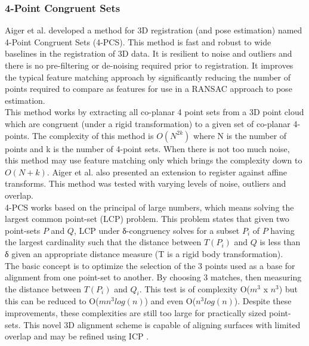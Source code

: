 \subsubsection{4-Point Congruent Sets}

Aiger et al. \cite{Aiger084} developed a method for 3D registration (and pose estimation) named 4-Point Congruent Sets (4-PCS). This method is fast and robust to wide baselines in the registration of 3D data. It is resilient to noise and outliers and there is no pre-filtering or de-noising required prior to registration. It improves the typical feature matching approach by significantly reducing the number of points required to compare as features for use in a RANSAC approach to pose estimation. \\

This method works by extracting all co-planar 4 point sets from a 3D point cloud which are congruent (under a rigid transformation) to a given set of co-planar 4-points. The complexity of this method is $O(N^{2k})$ where N is the number of points and k is the number of 4-point sets. When there is not too much noise, this method may use feature matching only which brings the complexity down to $O(N+k)$. Aiger et al. also presented an extension to register against affine transforms. This method was tested with varying levels of noise, outliers and overlap. \\

4-PCS works based on the principal of large numbers, which means solving the largest common point-set (LCP) problem. This problem states that given two point-sets $P$ and $Q$, LCP under δ-congruency solves for a subset $P_i$ of $P$ having the largest cardinality such that the distance between $T(P_i)$ and $Q$  is less than δ given an appropriate distance measure (T is a rigid body transformation). \\

The basic concept is to optimize the selection of the 3 points used as a base for alignment from one point-set to another. By choosing 3 matches, then measuring the distance between $T(P_i)$ and $Q_i$. This test is of complexity  O($m^3$ x $n^3$) but this can be reduced to  O($mn^3 log(n)$) \cite{Irani96Combinatorial} and even O($n^3 log(n)$). Despite these improvements, these complexities are still too large for practically sized point-sets. This novel 3D alignment scheme is capable of aligning surfaces with limited overlap and may be refined using ICP \cite{Rusinkiewicz01Efficient}. \\


